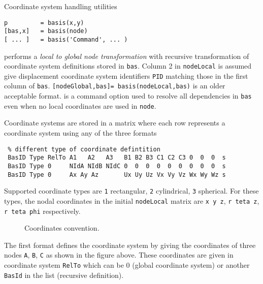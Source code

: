 

\noindent Coordinate system handling utilities


\rsyntax\begin{verbatim}
p         = basis(x,y)
[bas,x]   = basis(node)
[ ... ]   = basis('Command', ... )
\end{verbatim}



 performs a {\sl local to global node transformation} with recursive transformation of coordinate system definitions stored in {\tt bas}. Column 2 in {\tt nodeLocal} is assumed give displacement coordinate system identifiers {\tt PID} matching those in the first column of {\tt bas}. {\tt [nodeGlobal,bas]= basis(nodeLocal,bas)} is an older acceptable format.  is a command option used to resolve all dependencies in {\tt bas} even when no local coordinates are used in {\tt node}. 

Coordinate systems are stored in a matrix where each row represents a coordinate system using any of the three formats

\begin{verbatim}
 % different type of coordinate defintition
 BasID Type RelTo A1   A2   A3   B1 B2 B3 C1 C2 C3 0  0  0  s
 BasID Type 0     NIdA NIdB NIdC 0  0  0  0  0  0  0  0  0  s
 BasID Type 0     Ax Ay Az       Ux Uy Uz Vx Vy Vz Wx Wy Wz s
\end{verbatim}


Supported coordinate types are {\tt 1} rectangular, {\tt 2} cylindrical, {\tt 3} spherical. For these types, the nodal coordinates in the initial {\tt nodeLocal} matrix are {\tt x y z}, {\tt r teta z}, {\tt r teta phi} respectively.


\begin{figure}[H]
\centering
{} %
 \caption{Coordinates convention.}
\end{figure}


The first format defines the coordinate system by giving the coordinates of three nodes {\tt A}, {\tt B}, {\tt C} as shown in the figure above. These coordinates are given in coordinate system {\tt RelTo} which can be 0 (global coordinate system) or another {\tt BasId} in the list (recursive definition).

